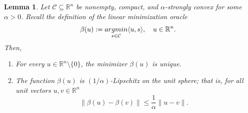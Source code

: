 \documentclass[10pt,a4paper]{amsart}
\newtheorem{lemma}{Lemma}
\newcommand\C{\mathcal{C}}
\newcommand\argmin{\mathop{\rm argmin}}
\begin{document}
\begin{lemma} \label{lem:lmo-lipschitz}
  Let $\C \subseteq \mathbb{R}^n$ be nonempty, compact, and $\alpha$-strongly convex for some $\alpha > 0$. Recall the definition of the linear minimization oracle
  \[
    \beta(u) := \argmin_{s\in\C}\langle{u, s}\rangle,\quad u \in \mathbb{R}^n.
  \]
  Then,
  \begin{enumerate}[label=(\roman*)]
      \item For every $u \in \mathbb{R}^n\setminus\{0\}$, the minimizer $\beta(u)$ is unique.
      \item The function $\beta(u)$ is $(1/\alpha)$-Lipschitz on the unit sphere; that is, for all unit vectors $u,v \in \mathbb{R}^n$
      \begin{equation} \label{eq:lmo-lip}
          \lVert \beta(u) - \beta(v)\rVert \leq \frac{1}{\alpha}\lVert u - v\rVert.
      \end{equation}
  \end{enumerate}
\end{lemma}
\end{document}
